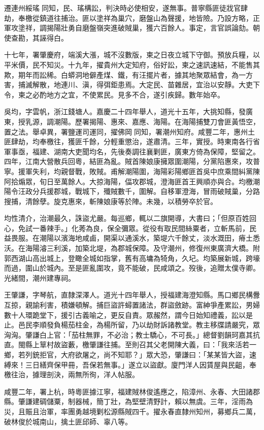 \begin{pinyinscope}
遷連州綏瑤同知，民、瑤構訟，判決時必使相安，遂無事。普寧縣匪徒戕官肆劫，奉檄從鎮道往捕治。匪以塗祥為巢穴，磨盤山為聲援，地皆險。乃設方略，正軍攻塗祥，調揭陽壯勇自磨盤嶺突進破賊巢，獲六百餘人。事定，言官誤論劾。朝使查勘，其誣得白。

十七年，署肇慶府，端溪大漲，城不沒數版，柬之日夜立城下守御。預放兵糧，以平米價，民不知災。十九年，擢貴州大定知府，俗好訟，柬之速訊速結，不能售其欺，期年而訟稀。白蟒洞地僻產煤、鐵，有汪擺片者，據其地聚眾結會，為一方害，捕滅解散，地連川、滇，得弭鉅患焉。大定民、苗雜居，宜治以安靜。大吏下令，柬之必酌地方之宜，不使累民。見多不合，遂引疾歸。數年始卒。

吳均，字雲帆，浙江錢塘人。嘉慶二十四年舉人，道光十五年，大挑知縣，發廣東，授乳源，調潮陽。歷署揭陽、惠來、嘉應、海陽。在海陽捕雙刀會匪黃悟空，置之法。舉卓異，署鹽運司運同，擢佛岡同知，署潮州知府。咸豐二年，惠州土匪肆劫，均奉檄往，獲匪千餘，分輕重懲治，遂肅清。三年，實授。時東南各行省軍事亟，福建、湖南大吏聞均名，先後奏調往襄剿匪，廣東方倚為保障，堅留之。四年，江南大營散兵回粵，結匪為亂。賊首陳娘康擁眾圍潮陽，分黨陷惠來，攻普寧。援軍失利，均親督戰，敗賊。甫解潮陽圍，海陽彩陽鄉匪首吳中庶乘間糾黨陳阿拾煽眾，旬日至萬餘人。大掠海陽，偪攻郡城，澄海匪首王興順亦與合。均檄潮陽令汪政分兵援郡城，戰城下，殲賊數千，圍解。自移軍澄海，冒雨破賊巢，分路搜捕，清餘孽。旋克惠來，斬陳娘康等於陣。未幾，以積勞卒於官。

均性清介，治潮最久，誅盜尤嚴。每巡鄉，輒以二旗開導，大書曰；「但原百姓回心，免試一番辣手。」化莠為良，保全彌眾。從役有取民間絲粟者，立斬馬前，民益畏服。在潮陽以濱海地咸鹵，開渠以通溪水，築堤六千餘丈，淡水溉田，瘠土悉沃。在海陽濬三利溪，加築北堤，為郡城保障。及守潮州，修復州東廣濟大橋。附郭西湖山高出城上，登瞰全城如指掌，舊有高墉為犄角，久圮。均築展新城，跨壕而過，圍山於城內。至是匪亂圍攻，竟不能破，民咸頌之。歿後，追贈太僕寺卿。光緒間，潮州建專祠。

王肇謙，字琴航，直隸深澤人。道光十四年舉人，授福建海澄知縣。馬口鄉民構釁互掠，親諭利害，積嫌頓解。捕巨盜許蟳置諸法，群盜斂跡。富紳爭產累訟，男婦數十人環跪堂下，援引古義喻之，更反自責。眾赧然，謂今日始知禮義，訟以是止。邑民李順發負楊茄柱金，為楊所留，乃以劫財訴諸教堂。教主移牒請嚴究，眾洶洶。肇謙白上官：「茄柱無罪，不必治；教士驕心，不可長。」總督劉韻珂嘉其抗直。閩縣上筸村故盜藪，檄肇謙往捕。至則召其父老開陳大義，曰：「我來活若一鄉，若列銃拒官，大府欲屠之，尚不知耶？」眾大恐，肇謙曰：「某某皆大盜，速縛來！三日繕齊保甲冊，吾保若無事。」遂立以盜獻。廈門洋人因賃屋與民齟，奉檄往治，據理剖決，兩無所徇，洋人帖服。

咸豐二年，署上杭，時粵匪據江寧，福建賊林俊遙應之，陷漳州、永春、大田諸郡縣。肇謙建碉儲粟，制器械，簡丁壯，為堅壁清野計，賴以無虞。三年，淫雨為災，且賑且治軍，率團勇越境剿松源縣賊四千。擢永春直隸州知州，募鄉兵二萬，破林俊於城南山，擒土匪邱師、辜八等。


\end{pinyinscope}
